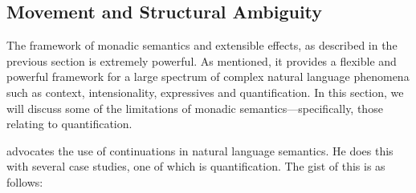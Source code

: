 \documentclass[a4paper]{article}
\begin{document}


%
%
%


\subsection{Movement and Structural Ambiguity}

The framework of monadic semantics and extensible effects, as
described in the previous section is extremely powerful. As mentioned,
it provides a flexible and powerful framework for a large spectrum of
complex natural language phenomena such as context, intensionality,
expressives and quantification. In this section, we will discuss some
of the limitations of monadic semantics---specifically, those relating
to quantification.

\citet{barker2002,barker2004} advocates the use of continuations in
natural language semantics. He does this with several case studies,
one of which is quantification. The gist of this is as follows:
\end{document}
